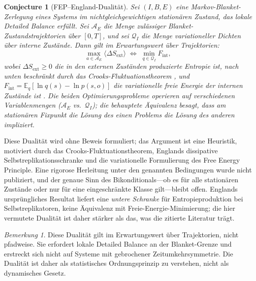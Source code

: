 \documentclass[12pt,a4paper]{article}
\newtheorem{conjecture}{Conjecture}
\theoremstyle{remark}
\newtheorem{remark}{Bemerkung}
\begin{document}
\begin{conjecture}[FEP--England-Dualit\"at]\label{lem:fep-england}
Sei $(I, B, E)$ eine Markov-Blanket-Zerlegung eines Systems im nichtgleichgewichtigen station\"aren Zustand, das lokale Detailed Balance erf\"ullt. Sei $\mathcal{A}_E$ die Menge zul\"assiger Blanket-Zustandstrajektorien \"uber $[0,T]$, und sei $\mathcal{Q}_I$ die Menge variationeller Dichten \"uber interne Zust\"ande. Dann gilt im Erwartungswert \"uber Trajektorien:
\[
  \max_{a \in \mathcal{A}_E} \langle \Delta S_{\mathrm{ext}} \rangle \;\Longleftrightarrow\; \min_{q \in \mathcal{Q}_I} F_{\mathrm{int}},
\]
wobei $\Delta S_{\mathrm{ext}} \geq 0$ die in den externen Zust\"anden produzierte Entropie ist, nach unten beschr\"ankt durch das Crooks-Fluktuationstheorem \citep{Crooks1999}, und $F_{\mathrm{int}} = \mathbb{E}_q[\ln q(s) - \ln p(s,o)]$ die variationelle freie Energie der internen Zust\"ande ist \citep{FristonFreeEnergy}. Die beiden Optimierungsprobleme operieren auf \emph{verschiedenen} Variablenmengen ($\mathcal{A}_E$ vs.\ $\mathcal{Q}_I$); die behauptete \"Aquivalenz besagt, dass am station\"aren Fixpunkt die L\"osung des einen Problems die L\"osung des anderen impliziert.
\end{conjecture}

Diese Dualit\"at wird ohne Beweis formuliert; das Argument ist eine Heuristik, motiviert durch das Crooks-Fluktuationstheorem, Englands dissipative Selbstreplikationsschranke \citep{England2013} und die variationelle Formulierung des Free Energy Principle. Eine rigorose Herleitung unter den genannten Bedingungen wurde nicht publiziert, und der genaue Sinn des Bikonditionals---ob es f\"ur alle station\"aren Zust\"ande oder nur f\"ur eine eingeschr\"ankte Klasse gilt---bleibt offen. Englands urspr\"ungliches Resultat liefert eine \emph{untere Schranke} f\"ur Entropieproduktion bei Selbstreplikatoren, keine \"Aquivalenz mit Freie-Energie-Minimierung; die hier vermutete Dualit\"at ist daher st\"arker als das, was die zitierte Literatur tr\"agt.

\begin{remark}
Diese Dualit\"at gilt im Erwartungswert \"uber Trajektorien, nicht pfadweise. Sie erfordert lokale Detailed Balance an der Blanket-Grenze und erstreckt sich nicht auf Systeme mit gebrochener Zeitumkehrsymmetrie. Die Dualit\"at ist daher als statistisches Ordnungsprinzip zu verstehen, nicht als dynamisches Gesetz.
\end{remark}

\end{document}
